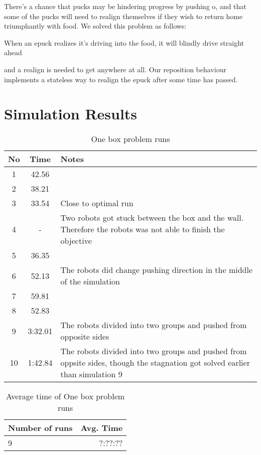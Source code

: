 \documentclass{article}
\begin{document}
There's a chance that pucks may be hindering progress by pushing o, and that some of the pucks will need to realign themselves if they wish to return home triumphantly with food. We solved this problem as follows:

When an epuck realizes it's driving into the food, it will blindly drive straight ahead


 and a realign is needed to get anywhere at all. Our reposition behaviour implements a stateless way to realign the epuck after some time has passed. 

\section{Simulation Results}

\begin{table}[h!]
\centering
\begin{tabular}{ c | c | p{5cm}}
\hline No & Time & Notes \\ \hline
 1 & 42.56 &  \\ \hline
 2 & 38.21 & \\ \hline
 3 & 33.54 & Close to optimal run \\ \hline
4 & - & Two robots got stuck between the box and the wall. Therefore the robots was not able to finish the objective \\ \hline
5 & 36.35 & \\ \hline
6	& 52.13 & The robots did change pushing direction in the middle of the simulation \\ \hline
7 & 59.81 & \\ \hline
8 & 52.83 & \\ \hline
9 & 3:32.01 &  The robots divided into two groups and pushed from opposite sides \\ \hline
10 & 1:42.84 & The robots divided into two groups and pushed from oppsite sides, though the stagnation got solved earlier than simulation 9 \\
\end{tabular}
\caption{One box problem runs}
\end{table}


\begin{table}
\centering
\begin{tabular}{ l | r}
\hline Number of runs & Avg. Time \\ \hline
9 & ?:??:?? \\
\end{tabular}
\caption{ Average time of One box problem runs}
\end{table}
\end{document}
